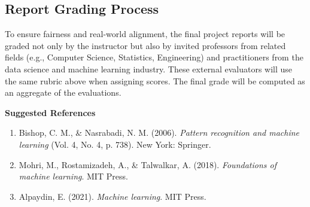 \documentclass[a4paper,10pt]{article}
\begin{document}
\subsection*{Report Grading Process}

To ensure fairness and real-world alignment, the final project reports will be graded not only by the instructor but also by invited professors from related fields (e.g., Computer Science, Statistics, Engineering) and practitioners from the data science and machine learning industry. These external evaluators will use the same rubric above when assigning scores. The final grade will be computed as an aggregate of the evaluations.

\vspace{1em}

\noindent \textbf{Suggested References}
\begin{enumerate}
    \item Bishop, C. M., \& Nasrabadi, N. M. (2006). \textit{Pattern recognition and machine learning} (Vol. 4, No. 4, p. 738). New York: Springer.
    \item Mohri, M., Rostamizadeh, A., \& Talwalkar, A. (2018). \textit{Foundations of machine learning}. MIT Press.
    \item Alpaydin, E. (2021). \textit{Machine learning}. MIT Press.
\end{enumerate}
\end{document}
